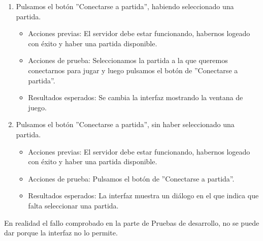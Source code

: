 \begin{enumerate}
\item Pulsamos el botón ''Conectarse a partida'', habiendo seleccionado una partida.
	\begin{itemize}
	\item Acciones previas: El servidor debe estar funcionando, habernos logeado con éxito y haber una partida disponible.
	\item Acciones de prueba: Seleccionamos la partida a la que queremos conectarnos para jugar y luego pulsamos el botón de ''Conectarse a partida''.
	\item Resultados esperados: Se cambia la interfaz mostrando la ventana de juego.
	\end{itemize}
\item Pulsamos el botón ''Conectarse a partida'', sin haber seleccionado una partida.
	\begin{itemize}
	\item Acciones previas: El servidor debe estar funcionando, habernos logeado con éxito y haber una partida disponible.
	\item Acciones de prueba: Pulsamos el botón de ''Conectarse a partida''.
	\item Resultados esperados: La interfaz muestra un diálogo en el que indica que falta seleccionar una partida.
	\end{itemize}
\end{enumerate}

En realidad el fallo comprobado en la parte de Pruebas de desarrollo, no se puede dar porque la interfaz no lo permite.
